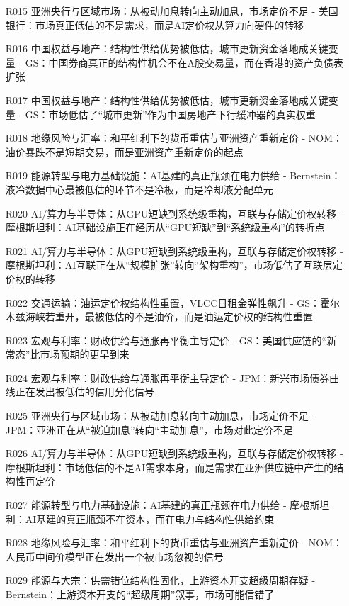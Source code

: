 \documentclass[11pt]{ctexart}
\begin{document}
\begin{itemize}
  \item [R015] 亚洲央行与区域市场：从被动加息转向主动加息，市场定价不足 - 美国银行：市场真正低估的不是需求，而是AI定价权从算力向硬件的转移
  \item [R016] 中国权益与地产：结构性供给优势被低估，城市更新资金落地成关键变量 - GS：中国券商真正的结构性机会不在A股交易量，而在香港的资产负债表扩张
  \item [R017] 中国权益与地产：结构性供给优势被低估，城市更新资金落地成关键变量 - GS：市场低估了“城市更新”作为中国房地产下行缓冲器的真实权重
  \item [R018] 地缘风险与汇率：和平红利下的货币重估与亚洲资产重新定价 - NOM：油价暴跌不是短期交易，而是亚洲资产重新定价的起点
  \item [R019] 能源转型与电力基础设施：AI基建的真正瓶颈在电力供给 - Bernstein：液冷数据中心最被低估的环节不是冷板，而是冷却液分配单元
  \item [R020] AI/算力与半导体：从GPU短缺到系统级重构，互联与存储定价权转移 - 摩根斯坦利：AI基础设施正在经历从“GPU短缺”到“系统级重构”的转折点
  \item [R021] AI/算力与半导体：从GPU短缺到系统级重构，互联与存储定价权转移 - 摩根斯坦利：AI互联正在从“规模扩张”转向“架构重构”，市场低估了互联层定价权的转移
  \item [R022] 交通运输：油运定价权结构性重置，VLCC日租金弹性飙升 - GS：霍尔木兹海峡若重开，最被低估的不是油价，而是油运定价权的结构性重置
  \item [R023] 宏观与利率：财政供给与通胀再平衡主导定价 - GS：美国供应链的“新常态”比市场预期的更早到来
  \item [R024] 宏观与利率：财政供给与通胀再平衡主导定价 - JPM：新兴市场债券曲线正在发出被低估的信用分化信号
  \item [R025] 亚洲央行与区域市场：从被动加息转向主动加息，市场定价不足 - JPM：亚洲正在从“被迫加息”转向“主动加息”，市场对此定价不足
  \item [R026] AI/算力与半导体：从GPU短缺到系统级重构，互联与存储定价权转移 - 摩根斯坦利：市场低估的不是AI需求本身，而是需求在亚洲供应链中产生的结构性再定价
  \item [R027] 能源转型与电力基础设施：AI基建的真正瓶颈在电力供给 - 摩根斯坦利：AI基建的真正瓶颈不在资本，而在电力与结构性供给约束
  \item [R028] 地缘风险与汇率：和平红利下的货币重估与亚洲资产重新定价 - NOM：人民币中间价模型正在发出一个被市场忽视的信号
  \item [R029] 能源与大宗：供需错位结构性固化，上游资本开支超级周期存疑 - Bernstein：上游资本开支的“超级周期”叙事，市场可能信错了

\end{itemize}
\end{document}
